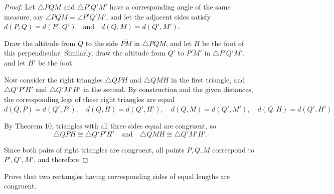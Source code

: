 \begin{proof}
    Let $\triangle PQM$ and $\triangle P'Q'M'$ have a corresponding angle of the same measure, say $\angle PQM = \angle P'Q'M'$, 
    and let the adjacent sides satisfy $d(P,Q) = d(P',Q') \quad \text{and} \quad d(Q,M) = d(Q',M')$.

    Draw the altitude from $Q$ to the side $\overline{PM}$ in $\triangle PQM$, and let $H$ be the foot of this perpendicular.  
    Similarly, draw the altitude from $Q'$ to $\overline{P'M'}$ in $\triangle P'Q'M'$, and let $H'$ be the foot.

    Now consider the right triangles $\triangle QPH$ and $\triangle QMH$ in the first triangle, 
        and $\triangle Q'P'H'$ and $\triangle Q'M'H'$ in the second.  
    By construction and the given distances, 
        the corresponding legs of these right triangles are equal 
        $d(Q,P) = d(Q',P'), \quad d(Q,H) = d(Q',H'), \quad d(Q,M) = d(Q',M'), \quad d(Q,H) = d(Q',H')$

    By Theorem 10, triangles with all three sides equal are congruent, so 
    \[
    \triangle QPH \cong \triangle Q'P'H' \quad \text{and} \quad \triangle QMH \cong \triangle Q'M'H'.
    \]

    Since both pairs of right triangles are congruent, all points $P, Q, M$ correspond to $P', Q', M'$, and therefore
\end{proof}


\begin{tcolorbox}[title=Problem 8, breakable]
    Prove that two rectangles having corresponding sides 
        of equal lengths are congruent.
\end{tcolorbox}

